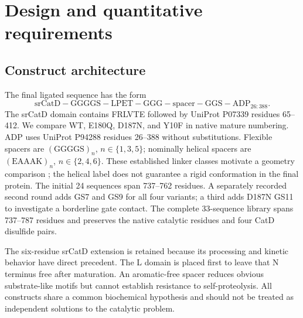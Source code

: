 \documentclass{article}
\begin{document}
\section{Design and quantitative requirements}
\subsection{Construct architecture}
The final ligated sequence has the form
\begin{equation*}
\mathrm{srCatD}\! -\! \mathrm{GGGGS}\! -\! \mathrm{LPET}\! -\!
\mathrm{GGG}\! -\! \mathrm{spacer}\! -\! \mathrm{GGS}\! -\! \mathrm{ADP}_{26:388}.
\end{equation*}
The srCatD domain contains FRLVTE followed by UniProt P07339 residues 65--412.
We compare WT, E180Q, D187N, and Y10F in native mature numbering. ADP uses
UniProt P94288 residues 26--388 without substitutions. Flexible spacers are
$(\mathrm{GGGGS})_n$, $n\in\{1,3,5\}$; nominally helical spacers are
$(\mathrm{EAAAK})_n$, $n\in\{2,4,6\}$. These established linker classes motivate
a geometry comparison \citep{arai2001}; the helical label does not guarantee a
rigid conformation in the final protein. The initial 24 sequences span
737--762 residues. A separately recorded second round adds GS7 and GS9 for all
four variants; a third adds D187N GS11 to investigate a borderline gate contact.
The complete 33-sequence library spans 737--787 residues and preserves the
native catalytic residues and four CatD disulfide pairs.

The six-residue srCatD extension is retained because its processing and kinetic
behavior have direct precedent. The L domain is placed first to leave that
N terminus free after maturation. An aromatic-free spacer reduces obvious
substrate-like motifs but cannot establish resistance to self-proteolysis.
All constructs share a common biochemical hypothesis and should not be treated
as independent solutions to the catalytic problem.
\end{document}
